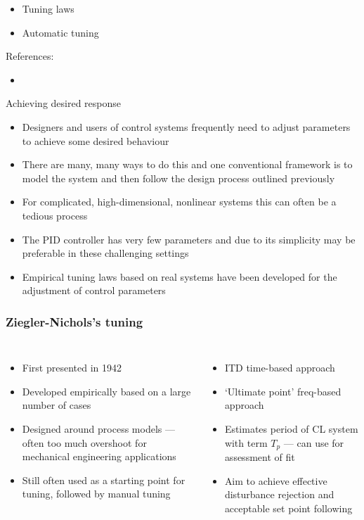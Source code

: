 \documentclass[10pt]{beamer-control}
\begin{document}

\begin{SUMMARY}
  \begin{itemize}
    \item Tuning laws
    \item Automatic tuning
  \end{itemize}
  \vfill References:
  \begin{itemize}
    \item \astrom[§11.3]
  \end{itemize}
\end{SUMMARY}




\begin{frame}{Achieving desired response}
  \begin{itemize}
    \item Designers and users of control systems frequently need to adjust parameters to achieve some desired behaviour
    \item There are many, many ways to do this and one conventional framework is to model the system and then follow the design process outlined previously
    \item For complicated, high-dimensional, nonlinear systems this can often be a tedious process
    \item The PID controller has very few parameters and due to its simplicity may be preferable in these challenging settings
    \item Empirical tuning laws based on real systems have been developed for the adjustment of control parameters
  \end{itemize}
\end{frame}

\begin{frame}
  \frametitle{Ziegler-Nichols's tuning}
  \small
  \begin{columns}
    \begin{itemize}
      \item First presented in 1942
      \item Developed empirically based on a large number of cases
      \item Designed around process models --- often too much overshoot for mechanical engineering applications
      \item Still often used as a starting point for tuning, followed by manual tuning
    \end{itemize}
    \begin{itemize}
      \item ITD time-based approach
      \item `Ultimate point' freq-based approach
      \item Estimates period of CL system with term $T_p$ --- can use for assessment of fit
      \item Aim to achieve effective disturbance rejection and acceptable set point following
    \end{itemize}
  \end{columns}
\end{frame}
\end{document}
